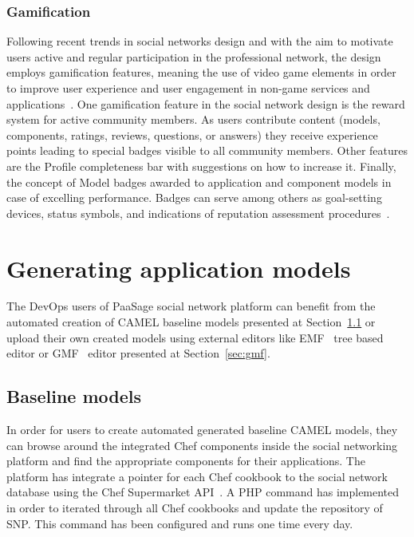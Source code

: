 \subsubsection{Gamification}
Following recent trends in social networks design and with the aim to motivate users active and regular participation in
the professional network, the design employs gamification features, meaning the use of video game elements in order to improve user experience and user engagement in non-game services and applications~\cite{deterding2011gamification}. One gamification feature in the social network design is the reward system for active community members. As users contribute content (models, components, ratings, reviews, questions, or answers) they receive experience points leading to special badges visible to all community members. Other features are the Profile completeness bar with suggestions on how to increase it. Finally, the concept of Model badges awarded to application and component models in case of excelling performance. Badges can serve among others as goal-setting devices, status symbols, and indications of reputation assessment procedures~\cite{antin2011badges}.

\section{Generating application models}
The DevOps users of PaaSage social network platform can benefit from the automated creation of CAMEL baseline models presented at Section~\ref{sec:automatedcreation} or upload their own created models using external editors like EMF~\cite{cdomodel} tree based editor or GMF~\cite{gmf_url} editor presented at Section~\ref{sec:gmf}.

\subsection{Baseline models}
\label{sec:automatedcreation}
In order for users to create automated generated baseline CAMEL models, they can browse around the integrated Chef components inside the social networking platform and find the appropriate components for their applications. The platform has integrate a pointer for each Chef cookbook to the social network database using the Chef Supermarket API~\cite{chef_api_url}. A PHP command has implemented in order to iterated through all Chef cookbooks and update the repository of SNP. This command has been configured and runs one time every day.

